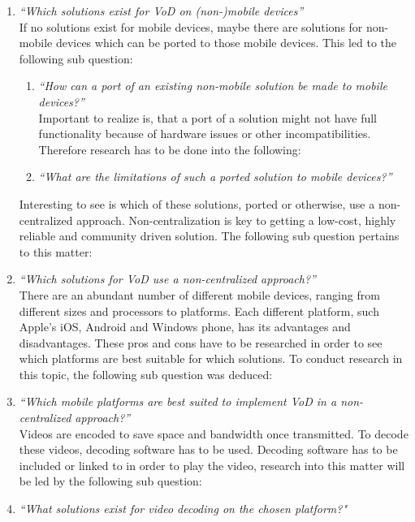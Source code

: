 \begin{enumerate}
	\item\textit{``Which solutions exist for VoD on (non-)mobile devices''}\\
	
	If no solutions exist for mobile devices, maybe there are solutions for non-mobile devices which can be ported to those mobile devices. This led to the following sub question:\\

		\begin{enumerate}
			\item\textit{``How can a port of an existing non-mobile solution be made to mobile devices?''}\\
			
			Important to realize is, that a port of a solution might not have full functionality because of hardware issues or other incompatibilities. Therefore research has to be done into the following:\\
			
			\item\textit{``What are the limitations of such a ported solution to mobile devices?''}\\
		\end{enumerate}

	Interesting to see is which of these solutions, ported or otherwise, use a non-centralized approach. Non-centralization is key to getting a low-cost, highly reliable and community driven solution. The following sub question pertains to this matter: \\

	\item\textit{``Which solutions for VoD use a non-centralized approach?''}\\

	There are an abundant number of different mobile devices, ranging from different sizes and processors to platforms. Each different platform, such Apple's iOS, Android and Windows phone, has its advantages and disadvantages. These pros and cons have to be researched in order to see which platforms are best suitable for which solutions. To conduct research in this topic, the following sub question was deduced:\\

	\item\textit{``Which mobile platforms are best suited to implement VoD in a non-centralized approach?''}\\
	
	Videos are encoded to save space and bandwidth once transmitted. To decode these videos, decoding software has to be used. Decoding software has to be included or linked to in order to play the video, research into this matter will be led by the following sub question:\\

	\item\textit{``What solutions exist for video decoding on the chosen platform?"}\\
\end{enumerate}

